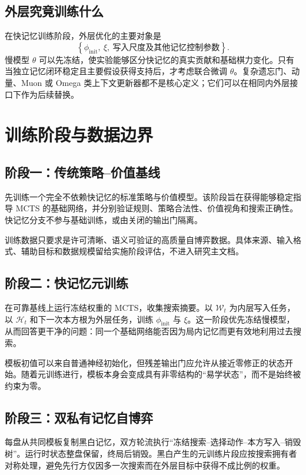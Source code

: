 \documentclass[UTF8,11pt,a4paper]{ctexart}
\newcommand{\slow}{\theta}
\newcommand{\metaweights}{\xi}
\newcommand{\memoryinit}{\phi_{\mathrm{init}}}
\begin{document}
\subsection{外层究竟训练什么}

在快记忆训练阶段，外层优化的主要对象是
\[
  \left\{\memoryinit,\ \metaweights,\ \text{写入尺度及其他记忆控制参数}\right\}.
\]
慢模型 $\slow$ 可以先冻结，使实验能够区分快记忆的真实贡献和基础棋力变化。只有当独立记忆闭环稳定且主要假设获得支持后，才考虑联合微调 $\slow$。复杂遗忘门、动量、Muon 或 Omega 类上下文更新器都不是核心定义；它们可以在相同内外层接口下作为后续替换\cite{titans,atlas,lact}。

\section{训练阶段与数据边界}

\subsection{阶段一：传统策略--价值基线}

先训练一个完全不依赖快记忆的标准策略与价值模型。该阶段旨在获得能够稳定指导 MCTS 的基础网络，并分别验证规则、策略合法性、价值视角和搜索正确性。快记忆分支不参与基础训练，或由关闭的输出门隔离。

训练数据只要求是许可清晰、语义可验证的高质量自博弈数据。具体来源、输入格式、辅助目标和数据规模留给实施阶段评估，不进入研究主文档。

\subsection{阶段二：快记忆元训练}

在可靠基线上运行冻结权重的 MCTS，收集搜索摘要。以 $\mathcal W_t$ 为内层写入任务，以 $\mathcal H_t$ 和下一次本方根为外层任务，训练 $\memoryinit$ 与 $\metaweights$。这一阶段优先冻结慢模型，从而回答更干净的问题：同一个基础网络能否因为局内记忆而更有效地利用过去搜索。

模板初值可以来自普通神经初始化，但残差输出门应允许从接近零修正的状态开始。随着元训练进行，模板本身会变成具有非零结构的“易学状态”，而不是始终被约束为零。

\subsection{阶段三：双私有记忆自博弈}

每盘从共同模板复制黑白记忆，双方轮流执行“冻结搜索--选择动作--本方写入--销毁树”。运行时状态整盘保留，终局后销毁。黑白产生的元训练片段应按搜索拥有者对称处理，避免先行方仅因多一次搜索而在外层目标中获得不成比例的权重。
\end{document}
